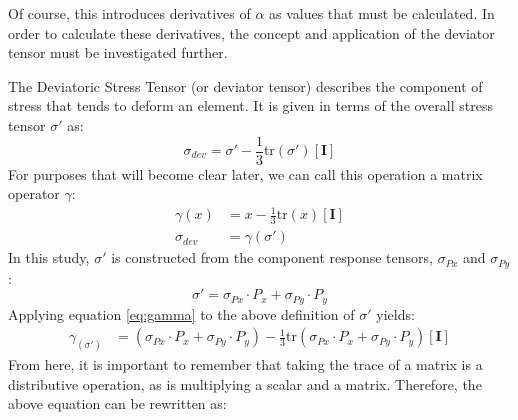 Of course, this introduces derivatives of $\alpha$ as values that must be calculated. In order to calculate these derivatives, the concept and application of the deviator tensor must be investigated further.


The Deviatoric Stress Tensor (or deviator tensor) describes the component of stress that tends to deform an element. It is given in terms of the overall stress tensor $\sigma'$ as: 
   \begin{equation}
      \sigma_{dev} = \sigma' - \frac{1}{3} \mathrm{tr}(\sigma') \left[ \mathbf{I} \right]
   \end{equation}
For purposes that will become clear later, we can call this operation a matrix operator $\gamma$:
   \begin{align}
      \gamma(x) &= x - \frac{1}{3} \mathrm{tr}(x) \left[ \mathbf{I} \right]\label{eq:gamma}\\
      \sigma_{dev} &= \gamma(\sigma') \nonumber
   \end{align}
In this study, $\sigma'$ is constructed from the component response tensors, $\sigma_{Px}$ and $\sigma_{Py}$:
   \begin{equation*}
      \sigma' = \sigma_{Px} \cdot P_x + \sigma_{Py} \cdot P_y
   \end{equation*}
Applying equation \ref{eq:gamma} to the above definition of $\sigma'$ yields:
   \begin{align}
	   \gamma_(\sigma') &= \left(\sigma_{Px} \cdot P_x + \sigma_{Py} \cdot P_y\right) - 
                       \frac{1}{3} \mathrm{tr} \left(\sigma_{Px} \cdot P_x + \sigma_{Py}
                       \cdot P_y\right) \left[ \mathbf{I} \right] 
   \end{align}
From here, it is important to remember that taking the trace of a matrix is a distributive operation, as is multiplying a scalar and a matrix. Therefore, the above equation can be rewritten as: 
